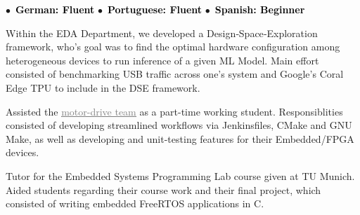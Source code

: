 \documentclass[10pt,a4paper,ragged2e,withhyper]{altacv}
\begin{document}
\begin{paracol}{2}
    $\bullet$\ \textbf{\textcolor{black}{German: Fluent}} \hfill $\bullet$\ \textbf{\textcolor{black}{Portuguese: Fluent}} \hfill $\bullet$\ \textbf{\textcolor{black}{Spanish: Beginner}}


%
%


\medskip

\nocite{*}

\switchcolumn
{}

Within the EDA Department, we developed a Design‑Space‑Exploration framework, 
who's goal was to find the optimal hardware configuration among heterogeneous devices to run inference of a given ML Model.
Main effort consisted of benchmarking USB traffic across one's system and Google's Coral Edge TPU to include in the DSE framework.

\divider

Assisted the \href{https://molabo.com/unternehmen/}{{\textcolor{gray}{\underline{motor-drive team}}}}
as a part-time working student. Responsiblities consisted of
developing streamlined workflows via Jenkinsfiles, CMake and GNU Make, as well as 
developing and unit-testing features for their Embedded/FPGA devices.

\divider

Tutor for the Embedded Systems Programming Lab course given at TU Munich.
Aided students regarding their course work and their final project, which 
consisted of writing embedded FreeRTOS applications in C.


\end{paracol}
\end{document}
